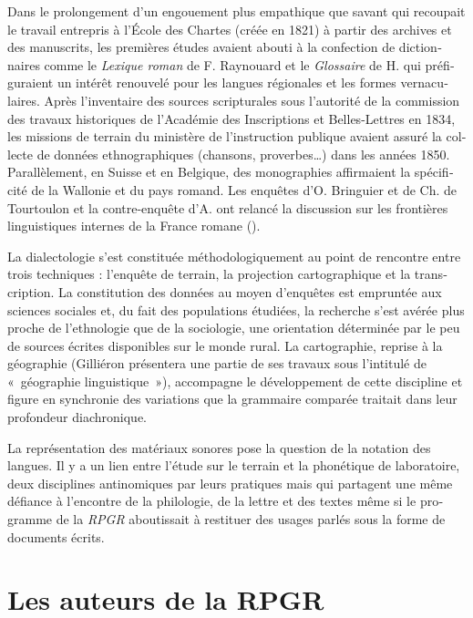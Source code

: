 \documentclass[french,output=paper,colorlinks,citecolor=brown]{../langscibook}
\begin{document}
\begin{otherlanguage}{french}
 Dans le prolongement d’un engouement plus empathique que savant qui recoupait le travail entrepris à l’École des Chartes (créée en 1821) à partir des archives et des manuscrits, les premières études avaient abouti à la confection de dictionnaires comme le \textit{Lexique roman} \citeyear{Raynouard1838} de F. Raynouard et le \textit{Glossaire} de H. \citet{Jaubert1856} qui préfiguraient un intérêt renouvelé pour les langues régionales et les formes vernaculaires. Après l’inventaire des sources scripturales sous l’autorité de la commission des travaux historiques de l’Académie des Inscriptions et Belles-Lettres en 1834, les missions de terrain du ministère de l’instruction publique avaient assuré la collecte de données ethnographiques (chansons, proverbes…) dans les années 1850. Parallèlement, en Suisse et en Belgique, des monographies affirmaient la spécificité de la Wallonie et du pays romand. Les enquêtes d’O. Bringuier et de Ch. de Tourtoulon \citeyear{TourtoulonBringuier1876} et la contre-enquête d’A. \citet{Thomas1879} ont relancé la discussion sur les frontières linguistiques internes de la France romane (\citealt{Brun-Trigaud1990}).

La dialectologie s’est constituée méthodologiquement au point de rencontre entre trois techniques : l’enquête de terrain, la projection cartographique et la transcription. La constitution des données au moyen d’enquêtes est empruntée aux sciences sociales et, du fait des populations étudiées, la recherche s’est avérée plus proche de l’ethnologie que de la sociologie, une orientation déterminée par le peu de sources écrites disponibles sur le monde rural. La cartographie, reprise à la géographie (Gilliéron présentera une partie de ses travaux sous l’intitulé de «~géographie linguistique~»), accompagne le développement de cette discipline et figure en synchronie des variations que la grammaire comparée traitait dans leur profondeur diachronique. 

La représentation des matériaux sonores pose la question de la notation des langues. Il y a un lien entre l’étude sur le terrain et la phonétique de laboratoire, deux disciplines antinomiques par leurs pratiques mais qui partagent une même défiance à l’encontre de la philologie, de la lettre et des textes même si le programme de la \textit{RPGR} aboutissait à restituer des usages parlés sous la forme de documents écrits. 

\section{Les auteurs de la RPGR} 


\end{otherlanguage}
\end{document}
